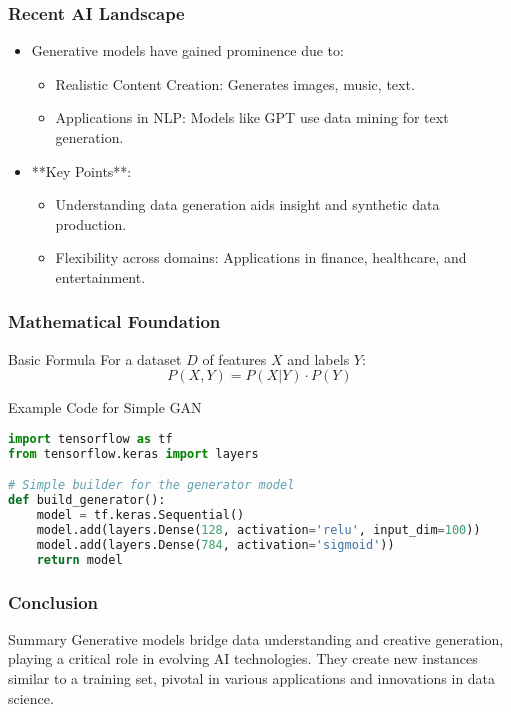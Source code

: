 \documentclass[aspectratio=169]{beamer}
\begin{document}
\begin{frame}[fragile]
    \frametitle{Recent AI Landscape}
    \begin{itemize}
        \item Generative models have gained prominence due to:
        \begin{itemize}
            \item Realistic Content Creation: Generates images, music, text.
            \item Applications in NLP: Models like GPT use data mining for text generation.
        \end{itemize}
        
        \item **Key Points**:
        \begin{itemize}
            \item Understanding data generation aids insight and synthetic data production.
            \item Flexibility across domains: Applications in finance, healthcare, and entertainment.
        \end{itemize}
    \end{itemize}
\end{frame}

\begin{frame}[fragile]
    \frametitle{Mathematical Foundation}
    \begin{block}{Basic Formula}
        For a dataset \( D \) of features \( X \) and labels \( Y \):
        \[
        P(X, Y) = P(X | Y) \cdot P(Y)
        \]
    \end{block}
    
    \begin{block}{Example Code for Simple GAN}
        \begin{lstlisting}[language=Python]
import tensorflow as tf
from tensorflow.keras import layers

# Simple builder for the generator model
def build_generator():
    model = tf.keras.Sequential()
    model.add(layers.Dense(128, activation='relu', input_dim=100))
    model.add(layers.Dense(784, activation='sigmoid'))
    return model
        \end{lstlisting}
    \end{block}
\end{frame}

\begin{frame}[fragile]
    \frametitle{Conclusion}
    \begin{block}{Summary}
        Generative models bridge data understanding and creative generation, playing a critical role in evolving AI technologies. They create new instances similar to a training set, pivotal in various applications and innovations in data science.
    \end{block}
\end{frame}
\end{document}
